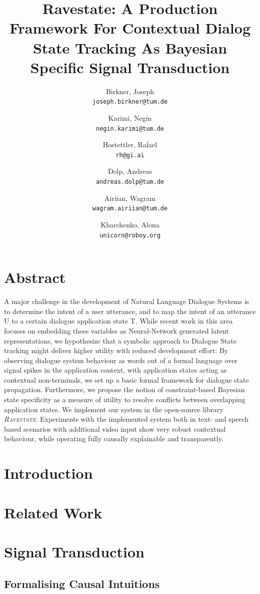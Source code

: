 \documentclass{article}
\title{Ravestate: A Production Framework For Contextual Dialog State Tracking As Bayesian Specific Signal Transduction}
\author{
	Birkner, Joseph \\ \texttt{joseph.birkner@tum.de}
	\and
	Karimi, Negin \\ \texttt{negin.karimi@tum.de}
	\and
	Hostettler, Rafael \\ \texttt{rh@gi.ai}
	\and
	Dolp, Andreas \\ \texttt{andreas.dolp@tum.de}
	\and
	Airiian, Wagram\\ \texttt{wagram.airiian@tum.de}
	\and
	Kharchenko, Alona \\ \texttt{unicorn@roboy.org}
}
\date{\vspace{-5ex}}
\newcommand{\rasta}{\textit{\textsc{Ravestate}}\xspace}
\begin{document}
\maketitle
\hrulefill

\begin{multicols}{2}

\section{Abstract}

A major challenge in the development of Natural Language Dialogue Systems is to determine the intent of a user utterance, and to map the intent of an utterance U to a certain dialogue application state T.
While recent work in this area focuses on embedding these variables as Neural-Network generated latent representations, we hypothesize that a symbolic approach to Dialogue State tracking might deliver higher utility with reduced development effort:
By observing dialogue system behaviour as words out of a formal language over signal spikes in the application context, with application states acting as contextual non-terminals, we set up a basic formal framework for dialogue state propagation.
Furthermore, we propose the notion of constraint-based Bayesian state specificity as a measure of utility to resolve conflicts between overlapping application states. We implement our system in the open-source library \rasta.
Experiments with the implemented system both in text- and speech based scenarios with additional video input show very robust contextual behaviour, while operating fully causally explainable and transparently.

\section{Introduction}


\section{Related Work}


\section{Signal Transduction}

\subsection{Formalising Causal Intuitions}


\end{multicols}
\end{document}
